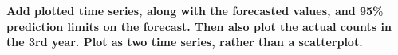 \documentclass [11pt, proquest] {uwthesis}[2015/03/03]
\begin{document}
\textbf{Add plotted time series, along with the forecasted values, and 95\% prediction limits on the forecast. Then also plot the actual counts in the 3rd year. Plot as two time series, rather than a scatterplot.}


\end{document}
